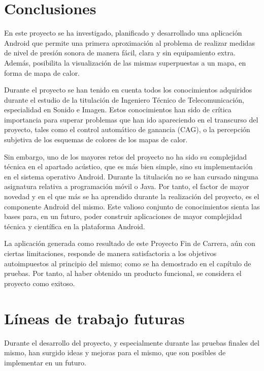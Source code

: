 \label{chp:concl}
\section{Conclusiones}
    En este proyecto se ha investigado, planificado y desarrollado una aplicación Android que permite una primera aproximación al problema de realizar medidas de nivel de presión sonora de manera fácil, clara y sin equipamiento extra. Además, posibilita la visualización de las mismas superpuestas a un mapa, en forma de mapa de calor.

    Durante el proyecto se han tenido en cuenta todos los conocimientos adquiridos durante el estudio de la titulación de Ingeniero Técnico de Telecomunicación, especialidad en Sonido e Imagen. Estos conocimientos han sido de crítica importancia para superar problemas que han ido apareciendo en el transcurso del proyecto, tales como el control automático de ganancia (CAG), o la percepción subjetiva de los esquemas de colores de los mapas de calor. 
    
    Sin embargo, uno de los mayores retos del proyecto no ha sido su complejidad técnica en el apartado acústico, que es más bien simple, sino su implementación en el sistema operativo Android. Durante la titulación no se han cursado ninguna asignatura relativa a programación móvil o Java. Por tanto, el  factor de mayor novedad y en el que más se ha aprendido durante la realización del proyecto, es el componente Android del mismo. Este valioso conjunto de conocimientos sienta las bases para, en un futuro, poder construir aplicaciones de mayor complejidad técnica y científica en la plataforma Android.
    
    La aplicación generada como resultado de este Proyecto Fin de Carrera, aún con ciertas limitaciones, responde de manera satisfactoria a los objetivos autoimpuestos al principio del mismo; como se ha demostrado en el capítulo de pruebas. Por tanto, al haber obtenido un producto funcional, se considera el proyecto como exitoso.
    
\section{Líneas de trabajo futuras}
    Durante el desarrollo del proyecto, y especialmente durante las pruebas finales del mismo, han surgido ideas y mejoras para el mismo, que son posibles de implementar en un futuro.
     
